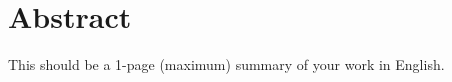 \chapter{Abstract}


\begin{english} %
This should be a 1-page (maximum) summary of your work in English.
\end{english}


